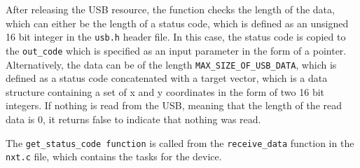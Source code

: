 After releasing the USB resource, the function checks the length of the data, which can either be the length of a status code, which is defined as an unsigned 16 bit integer in the \texttt{usb.h} header file.
In this case, the status code is copied to the \texttt{out\_code} which is specified as an input parameter in the form of a pointer.
Alternatively, the data can be of the length \texttt{MAX\_SIZE\_OF\_USB\_DATA}, which is defined as a status code concatenated with a target vector, which is a data structure containing a set of x and y coordinates in the form of two 16 bit integers.
If nothing is read from the USB, meaning that the length of the read data is $0$, it returns false to indicate that nothing was read.

The \texttt{get\_status\_code function} is called from the \texttt{receive\_data} function in the \texttt{nxt.c} file, which contains the tasks for the device.
